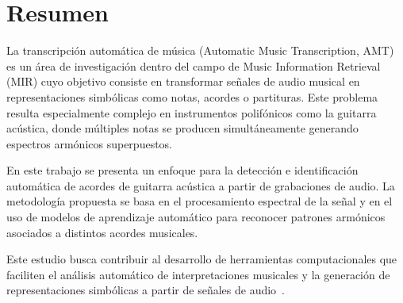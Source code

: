\section{Resumen}
La transcripción automática de música (Automatic Music Transcription, AMT) es un área de investigación dentro del campo de Music Information Retrieval (MIR) cuyo objetivo consiste en transformar señales de audio musical en representaciones simbólicas como notas, acordes o partituras. Este problema resulta especialmente complejo en instrumentos polifónicos como la guitarra acústica, donde múltiples notas se producen simultáneamente generando espectros armónicos superpuestos.

En este trabajo se presenta un enfoque para la detección e identificación automática de acordes de guitarra acústica a partir de grabaciones de audio. La metodología propuesta se basa en el procesamiento espectral de la señal y en el uso de modelos de aprendizaje automático para reconocer patrones armónicos asociados a distintos acordes musicales.

Este estudio busca contribuir al desarrollo de herramientas computacionales que faciliten el análisis automático de interpretaciones musicales y la generación de representaciones simbólicas a partir de señales de audio~\cite{benetos2019automatic}.